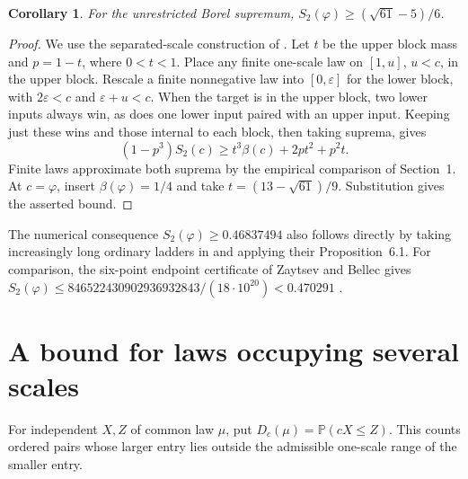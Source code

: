 \documentclass[11pt]{article}
\newtheorem{corollary}[theorem]{Corollary}
\newcommand{\bbP}{\mathbb P}
\newcommand{\ph}{\varphi}
\begin{document}
\begin{corollary}\label{co:global}
For the unrestricted Borel supremum,
$\displaystyle S_2(\ph)\ge (\sqrt{61}-5)/6$.
\end{corollary}
\begin{proof}
We use the separated-scale construction of \cite[Proposition~6.1]{zb}.
Let $t$ be the upper block mass and $p=1-t$, where $0<t<1$.
Place any finite one-scale law on $[1,u]$, $u<c$, in the upper block.
Rescale a finite nonnegative law into $[0,\varepsilon]$ for the lower
block, with $2\varepsilon<c$ and $\varepsilon+u<c$.
When the target is in the upper block, two lower inputs always win,
as does one lower input paired with an upper input. Keeping just
these wins and those internal to each block, then taking suprema,
gives
\[
 (1-p^3)S_2(c)\ge t^3\beta(c)+2pt^2+p^2t .
\]
Finite laws approximate both suprema by the empirical comparison
of Section~1. At $c=\ph$, insert $\beta(\ph)=1/4$ and take
$t=(13-\sqrt{61})/9$. Substitution gives the asserted bound.
\end{proof}
The numerical consequence $S_2(\ph)\ge 0.46837494$ also follows directly by taking increasingly long ordinary ladders in \cite[\S6.1.4]{zb} and applying their Proposition~6.1. For comparison, the
six-point endpoint certificate of Zaytsev and Bellec gives
$S_2(\ph)\le 846522430902936932843/(18\cdot10^{20})<0.470291$
\cite[\S6.1.8 and ancillary certificates]{zb}.

\section{A bound for laws occupying several scales}
For independent $X,Z$ of common law $\mu$, put
$D_c(\mu)=\bbP(cX\le Z)$. This counts ordered pairs whose larger
entry lies outside the admissible one-scale range of the smaller entry.
\end{document}

